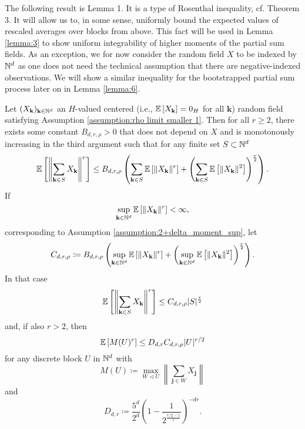 The following result is \cite{[0]BUCCHIA2017344} Lemma 1. It is a type of Rosenthal inequality, cf. \cite{rosenthal1970} Theorem 3.
It will allow us to, in some sense, uniformly bound the expected values of rescaled averages over blocks from above. This fact will be used in Lemma \ref{lemma:3} to show uniform integrability of higher moments of the partial sum fields. As an exception, we for now consider the random field $X$ to be indexed by $\mathbb{N}^d$ as one does not need the technical assumption that there are negative-indexed observations.
We will show a similar inequality for the bootstrapped partial sum process later on in Lemma \ref{lemma:6}.

\begin{lemma} \label{lemma:1}
    Let $(X_{\mathbf{k}})_{\mathbf{k} \in \mathbb{N}^d}$ an $H$-valued centered (i.e., $\mathbb{E}\left[X_\mathbf{k}\right] = 0_{H}$ for all $\mathbf{k}$) random field satisfying Assumption \ref{assumption:rho limit smaller 1}.
    Then for all $r \geq 2$, there exists some constant $B_{d, r, \rho} > 0$ that does not depend on $X$ and is monotonously increasing in the third argument such that for any finite set $S \subset \mathbb{N}^d$
    \begin{equation} \label{equation:lemma1:6}
        \mathbb{E}\left[\left\| \sum\limits_{\mathbf{k} \in S} X_\mathbf{k} \right\|^r\right] \leq B_{d, r, \rho} \left( \sum\limits_{\mathbf{k} \in S} \mathbb{E}\left[\| X_\mathbf{k} \|^r\right] + \left( \sum\limits_{\mathbf{k} \in S} \mathbb{E}\left[\| X_\mathbf{k} \|^2\right] \right)^\frac{r}{2} \right).
    \end{equation}
    If 
    \begin{equation} 
        \sup\limits_{\mathbf{k} \in \mathbb{N} ^d} \mathbb{E}\left[\| X_\mathbf{k} \|^r\right] < \infty,
    \end{equation}
    corresponding to Assumption \ref{assumption:2+delta_moment_sup}, let
    \begin{equation} \label{definition:lemma1:7}
        C_{d, r, \rho} \coloneqq B_{d, r, \rho} \left( \sup\limits_{\mathbf{k} \in \mathbb{N}^d} \mathbb{E}\left[\| X_\mathbf{k}\|^r\right] + \left( \sup\limits_{\mathbf{k} \in \mathbb{N}^d} \mathbb{E}\left[\|X_\mathbf{k}\|^2\right] \right)^\frac{r}{2} \right).
    \end{equation}
    In that case
    \begin{equation} \label{lemma1:(7)}
        \mathbb{E}\left[\left\| \sum\limits_{\mathbf{k} \in S} X_\mathbf{k} \right\|^r\right] \leq C_{d, r, \rho} |S|^\frac{r}{2}
    \end{equation}
    and, if also $r > 2$, then
    \begin{equation} \label{lemma1:(9)}
        \mathbb{E}\left[M(U)^r\right] \leq D_{d, r} C_{d, r, \rho} |U|^{r/2}
    \end{equation}
    for any discrete block $U$ in $\mathbb{N}^d$ with
    \begin{equation} \label{lemma1:(8)}
         M(U) \coloneqq \max\limits_{W \lhd U} \left\| \sum\limits_{\mathbf{j} \in W} X_\mathbf{j} \right\|
    \end{equation}
    and
    \[ D_{d, r} \coloneqq \frac{5^d}{2^d} \left( 1- \frac{1}{2^{\frac{r/2-1}{r}}} \right)^{-dr}. \]
\end{lemma}

